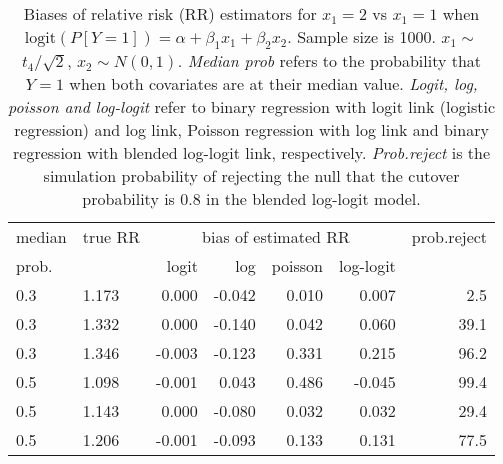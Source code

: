 \documentclass[12pt,a4paper]{article}
\begin{document}
\begin{table}[H] 
\small\sf\centering 
\caption{Biases of relative risk (RR) estimators for $x_1=2$ vs $x_1=1$ when $\mbox{logit}(P[Y=1])=\alpha+\beta_1 x_1 + \beta_2 x_2$. Sample size is 1000. $x_1 \sim $$t_4/\sqrt{2}$, $x_2 \sim N(0,1)$. {\it Median prob} refers to the probability that $Y=1$ when both covariates are at their median value. {\it Logit, log, poisson and log-logit} refer to binary regression with logit link (logistic regression) and log link, Poisson regression with log link and binary regression with blended log-logit link, respectively. {\it Prob.reject} is the simulation probability of rejecting the null that the cutover probability is $0.8$ in the blended log-logit model.} 
\begin{tabular}{llrrrrr} 
\toprule 
median & true RR & \multicolumn{4}{c}{bias of estimated RR} & prob.reject \\ 
prob. & & logit & log & poisson & log-logit  & \\ \midrule 
0.3 & 1.173 &  0.000 & -0.042 & 0.010 &  0.007 &  2.5 \\  
0.3 & 1.332 &  0.000 & -0.140 & 0.042 &  0.060 & 39.1 \\  
0.3 & 1.346 & -0.003 & -0.123 & 0.331 &  0.215 & 96.2 \\  
0.5 & 1.098 & -0.001 &  0.043 & 0.486 & -0.045 & 99.4 \\  
0.5 & 1.143 &  0.000 & -0.080 & 0.032 &  0.032 & 29.4 \\  
0.5 & 1.206 & -0.001 & -0.093 & 0.133 &  0.131 & 77.5 \\  
\bottomrule 
\end{tabular} 
\end{table} 
\end{document}
